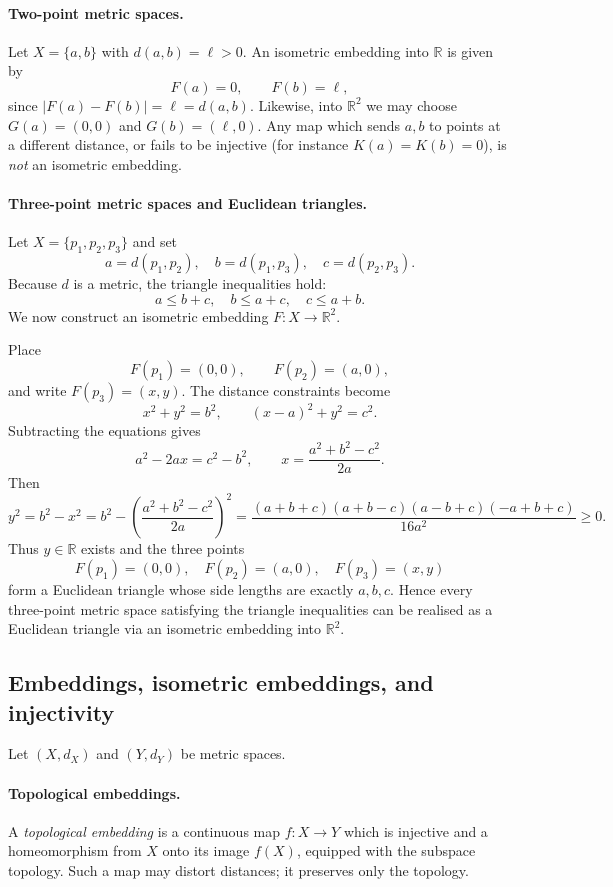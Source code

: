 \documentclass[12pt,a4paper]{article}
\theoremstyle{plain}
\theoremstyle{definition}      %
\begin{document}
	\paragraph{Two-point metric spaces.}
	Let $X=\{a,b\}$ with $d(a,b)=\ell>0$.  An isometric embedding into
	$\mathbb{R}$ is given by
	\[
	F(a)=0,\qquad F(b)=\ell,
	\]
	since $|F(a)-F(b)|=\ell=d(a,b)$.  Likewise, into $\mathbb{R}^2$ we may choose
	$G(a)=(0,0)$ and $G(b)=(\ell,0)$.  Any map which sends $a,b$ to points at a
	different distance, or fails to be injective (for instance $K(a)=K(b)=0$), is
	\emph{not} an isometric embedding.
	
	\paragraph{Three-point metric spaces and Euclidean triangles.}
	Let $X=\{p_1,p_2,p_3\}$ and set
	\[
	a=d(p_1,p_2),\quad b=d(p_1,p_3),\quad c=d(p_2,p_3).
	\]
	Because $d$ is a metric, the triangle inequalities hold:
	\[
	a\le b+c,\quad b\le a+c,\quad c\le a+b.
	\]
	We now construct an isometric embedding $F:X\to\mathbb{R}^2$.
	
	Place
	\[
	F(p_1)=(0,0),\qquad F(p_2)=(a,0),
	\]
	and write $F(p_3)=(x,y)$.  The distance constraints become
	\[
	x^2+y^2=b^2,\qquad (x-a)^2+y^2=c^2.
	\]
	Subtracting the equations gives
	\[
	a^2-2ax=c^2-b^2,\qquad
	x=\frac{a^2+b^2-c^2}{2a}.
	\]
	Then
	\[
	y^2=b^2-x^2
	=b^2-\left(\frac{a^2+b^2-c^2}{2a}\right)^2
	=\frac{(a+b+c)(a+b-c)(a-b+c)(-a+b+c)}{16a^2}\ge 0.
	\]
	Thus $y\in\mathbb{R}$ exists and the three points
	\[
	F(p_1)=(0,0),\quad F(p_2)=(a,0),\quad F(p_3)=(x,y)
	\]
	form a Euclidean triangle whose side lengths are exactly
	$a,b,c$.  Hence every three-point metric space satisfying the triangle
	inequalities can be realised as a Euclidean triangle via an isometric
	embedding into $\mathbb{R}^2$.
	
	\subsection*{Embeddings, isometric embeddings, and injectivity}
	
	Let $(X,d_X)$ and $(Y,d_Y)$ be metric spaces.
	
	\paragraph{Topological embeddings.}
	A \emph{topological embedding} is a continuous map $f:X\to Y$ which is
	injective and a homeomorphism from $X$ onto its image $f(X)$, equipped with
	the subspace topology.  Such a map may distort distances; it preserves only
	the topology.
	
\end{document}
